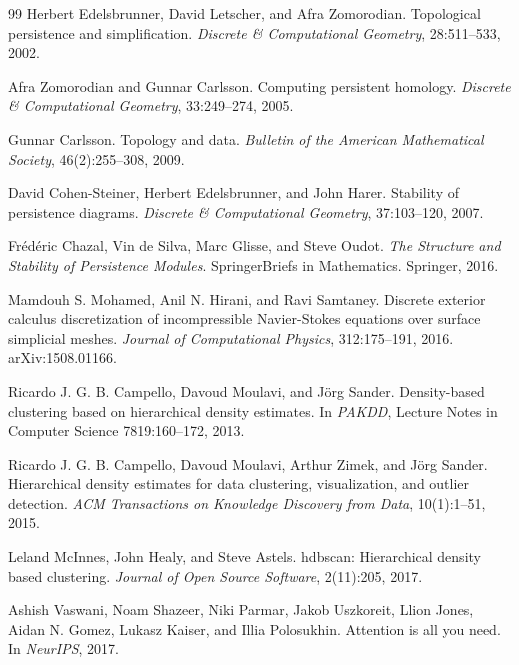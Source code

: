 \documentclass[11pt]{article}
\theoremstyle{definition}
\theoremstyle{plain}
\theoremstyle{remark}
\numberwithin{equation}{section}
\begin{document}
\begin{thebibliography}{99}
Herbert Edelsbrunner, David Letscher, and Afra Zomorodian.
\newblock Topological persistence and simplification.
\newblock \emph{Discrete \& Computational Geometry}, 28:511--533, 2002.

Afra Zomorodian and Gunnar Carlsson.
\newblock Computing persistent homology.
\newblock \emph{Discrete \& Computational Geometry}, 33:249--274, 2005.

Gunnar Carlsson.
\newblock Topology and data.
\newblock \emph{Bulletin of the American Mathematical Society}, 46(2):255--308, 2009.

David Cohen-Steiner, Herbert Edelsbrunner, and John Harer.
\newblock Stability of persistence diagrams.
\newblock \emph{Discrete \& Computational Geometry}, 37:103--120, 2007.

Fr\'ed\'eric Chazal, Vin de Silva, Marc Glisse, and Steve Oudot.
\newblock \emph{The Structure and Stability of Persistence Modules}.
\newblock SpringerBriefs in Mathematics. Springer, 2016.

Mamdouh S. Mohamed, Anil N. Hirani, and Ravi Samtaney.
\newblock Discrete exterior calculus discretization of incompressible Navier-Stokes equations over surface simplicial meshes.
\newblock \emph{Journal of Computational Physics}, 312:175--191, 2016. arXiv:1508.01166.

Ricardo J. G. B. Campello, Davoud Moulavi, and J\"org Sander.
\newblock Density-based clustering based on hierarchical density estimates.
\newblock In \emph{PAKDD}, Lecture Notes in Computer Science 7819:160--172, 2013.

Ricardo J. G. B. Campello, Davoud Moulavi, Arthur Zimek, and J\"org Sander.
\newblock Hierarchical density estimates for data clustering, visualization, and outlier detection.
\newblock \emph{ACM Transactions on Knowledge Discovery from Data}, 10(1):1--51, 2015.

Leland McInnes, John Healy, and Steve Astels.
\newblock hdbscan: Hierarchical density based clustering.
\newblock \emph{Journal of Open Source Software}, 2(11):205, 2017.

Ashish Vaswani, Noam Shazeer, Niki Parmar, Jakob Uszkoreit, Llion Jones, Aidan N. Gomez, Lukasz Kaiser, and Illia Polosukhin.
\newblock Attention is all you need.
\newblock In \emph{NeurIPS}, 2017.


\end{thebibliography}
\end{document}
